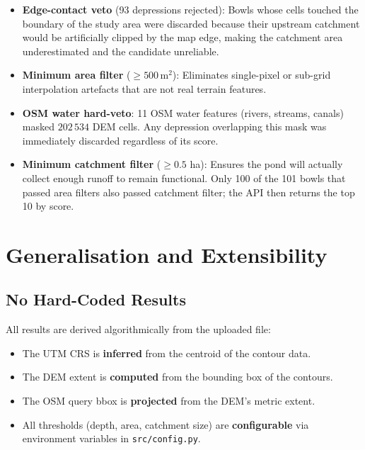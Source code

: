 \documentclass[12pt,a4paper]{article}
\begin{document}
\begin{itemize}
    \item \textbf{Edge-contact veto} (93 depressions rejected): Bowls whose cells
          touched the boundary of the study area were discarded because their upstream
          catchment would be artificially clipped by the map edge, making the catchment
          area underestimated and the candidate unreliable.
    \item \textbf{Minimum area filter} ($\geq 500\,\text{m}^2$): Eliminates
          single-pixel or sub-grid interpolation artefacts that are not real terrain
          features.
    \item \textbf{OSM water hard-veto}: 11 OSM water features (rivers, streams, canals)
          masked $202\,534$ DEM cells. Any depression overlapping this mask was
          immediately discarded regardless of its score.
    \item \textbf{Minimum catchment filter} ($\geq 0.5$ ha): Ensures the pond will
          actually collect enough runoff to remain functional. Only 100 of the 101
          bowls that passed area filters also passed catchment filter; the API then
          returns the top 10 by score.
\end{itemize}

\section{Generalisation and Extensibility}

\subsection{No Hard-Coded Results}
All results are derived algorithmically from the uploaded file:
\begin{itemize}
    \item The UTM CRS is \textbf{inferred} from the centroid of the contour data.
    \item The DEM extent is \textbf{computed} from the bounding box of the contours.
    \item The OSM query bbox is \textbf{projected} from the DEM's metric extent.
    \item All thresholds (depth, area, catchment size) are \textbf{configurable}
          via environment variables in \texttt{src/config.py}.
\end{itemize}
\end{document}
